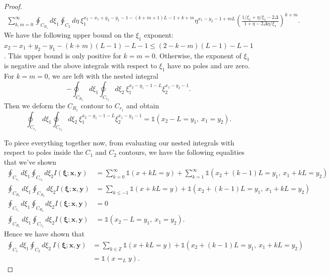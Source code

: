 \documentclass[10pt,a4paper]{amsart}
\begin{document}
\begin{proof}
\begin{equation}
\begin{split}
    \sum_{k,m=0}^{\infty}\oint_{C_{R_1}}d\xi_1\oint_{C_{2}}d\eta \ \xi_1^{x_2-x_1+y_2-y_1-1-(k+m+1)L - 1 + k + m}\eta^{x_1-y_2-1+mL}\left(\frac{1/\xi_1+\eta/\xi_1-2\Delta}{1+\eta-2\Delta \eta/\xi_1} \right)^{k+m}.
    \end{split}
\end{equation}
 We have the following upper bound on the $\xi_1$ exponent: 
 $x_2-x_1+y_2-y_1-(k+m)(L-1)-L-1
 \leq (2-k-m)(L-1)-L-1$.
 This upper bound is only positive for $k=m=0$. Otherwise, the exponent of $\xi_1$ is negative and the above integrals with respect to $\xi_1$ have no poles and are zero. For $k=m=0$, we are left with the nested integral 
 \begin{equation}
     -\oint_{C_{R_1}}d\xi_1\oint_{C_{r_2}}d\xi_2 \ \xi_1^{x_2-y_1-1-L}\xi_2^{x_1-y_2-1}.
 \end{equation}
 Then we deform the $C_{R_1}$ contour to $C_{r_1}$ and obtain 
\begin{equation}
    \oint_{C_{r_1}}d\xi_1\oint_{C_{r_2}}d\xi_2 \ \xi_1^{x_2-y_1-1-L}\xi_2^{x_1-y_2-1} = \mathds{1}(x_2-L=y_1, \ x_1=y_2).
\end{equation}

To piece everything together now, from evaluating our nested integrals with respect to poles inside the $C_1$ and $C_2$ contours, we have the following equalities that we've shown 
\begin{equation}
    \begin{split}
        \oint_{C_{r_1}}d\xi_1\oint_{C_{r_2}}d\xi_2 I(\boldsymbol{\xi};\mathbf{x},\mathbf{y}) &= \sum_{k=0}^\infty \mathds{1}(x+kL=y) + \sum_{k=1}^\infty\mathds{1}(x_2+(k-1)L=y_1,\ x_1+kL=y_2) \\
        \oint_{C_{R_1}}d\xi_1\oint_{C_{R_2}}d\xi_2 I(\boldsymbol{\xi};\mathbf{x},\mathbf{y}) &= \sum_{k\leq -1} \mathds{1}(x+kL=y) + \mathds{1}(x_2+(k-1)L=y_1,\ x_1+kL=y_2) \\
        \oint_{C_{r_1}}d\xi_1\oint_{C_{R_2}}d\xi_2 I(\boldsymbol{\xi};\mathbf{x},\mathbf{y}) &= 0 \\
        \oint_{C_{R_1}}d\xi_1\oint_{C_{r_2}}d\xi_2 I(\boldsymbol{\xi};\mathbf{x},\mathbf{y}) &= \mathds{1}(x_2-L=y_1,\ x_1=y_2).
    \end{split}
\end{equation}
Hence we have shown that 
\begin{equation}
\begin{split}
    \oint_{C_1}d\xi_1\oint_{C_2}d\xi_2 \ I(\boldsymbol{\xi};\mathbf{x},\mathbf{y}) &= \sum_{k\in\mathbb{Z}}\mathds{1}(x+kL=y) + \mathds{1}(x_2+(k-1)L=y_1,\ x_1+kL=y_2)\\
    &= \mathds{1}(x=_L y).
\end{split}
\end{equation}
\end{proof}
\end{document}
